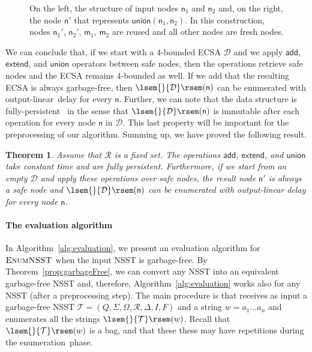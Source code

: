 \documentclass[
a4paper
]{article}
\theoremstyle{plain}
\newtheorem{theorem}{Theorem}[section]
\theoremstyle{definition}
\theoremstyle{remark}
\newcommand{\Reg}{\mathcal{R}}
\newcommand{\nsst}{\mathcal{T}}
\newcommand{\D}{\mathcal{D}}
\newcommand{\n}{\textsf{n}}
\newcommand{\m}{\textsf{m}}
\newcommand{\dadd}{\operatorname{add}}
\newcommand{\dunion}{\operatorname{union}}
\newcommand{\dextend}{\operatorname{extend}}
\newcommand{\sem}[1]{{\lsem{}{#1}\rsem}}
\renewcommand{\operatorname}[1]{\textsf{#1}}
\begin{document}
\begin{figure}[t]
	\caption{On the left, the structure of input nodes $\n_1$ and $\n_2$ and, on the right, the node $\n'$ that represents $\dunion(\n_1, \n_2)$. In this construction, nodes $\n_1'$, $\n_2'$, $\m_1$, $\m_2$ are reused and all other nodes are fresh nodes.}
	\label{fig:union-op}
\end{figure}

We can conclude that, if we start with a $4$-bounded ECSA $\D$ and we apply $\dadd$, $\dextend$, and $\dunion$ operators between safe nodes, then the operations retrieve safe nodes and the ECSA remains $4$-bounded as well.
If we add that the resulting ECSA is always garbage-free, then $\sem{\D}(\n)$ can be enumerated with output-linear~delay for every $\n$.
Further, we can note that the data structure is fully-persistent~\cite{DriscollSST86} in the sense that $\sem{\D}(\n)$ is immutable after each operation for every node $\n$ in $\D$. This last property will be important for the preprocessing of our algorithm. Summing up, we have proved the following result. 

\begin{theorem}\label{theo:data-structure}
	Assume that $\Reg$ is a fixed set. The operations $\dadd$, $\dextend$, and $\dunion$ take constant time and are fully persistent. Furthermore, if we start from an empty $\D$ and apply these operations over safe nodes, the result node $\n'$ is always a safe node and $\sem{\D}(\n)$ can be enumerated with output-linear delay for every node $\n$.
\end{theorem} 

\paragraph{The evaluation algorithm} In Algorithm~\ref{alg:evaluation}, we present an evaluation algorithm for $\textsc{EnumNSST}$ when the input NSST is garbage-free. By Theorem~\ref{prop:garbageFree}, we can convert any NSST into an equivalent garbage-free NSST and, therefore, Algorithm~\ref{alg:evaluation} works also for any NSST (after a preprocessing step). 
The main procedure is  that receives as input a garbage-free NSST $\nsst = (Q, \Sigma, \Omega, \Reg, \Delta, I, F)$ and a string $w =a_1 \ldots a_n$ and enumerates all the strings $\sem{\nsst}(w)$. Recall that $\sem{\nsst}(w)$ is a bag, and that these these may have repetitions during the enumeration~phase. 
\end{document}
